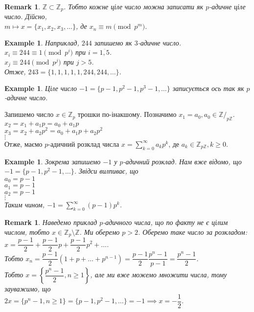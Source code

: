 \documentclass[a4paper, 14pt]{extarticle}
\theoremstyle{theoremdd}
\theoremstyle{theoremdd}
\theoremstyle{theoremdd}
\theoremstyle{theoremdd}
\newtheorem{example}[theorem]{Example}
\theoremstyle{theoremdd}
\theoremstyle{theoremdd}
\newtheorem{remark}[theorem]{Remark}
\theoremstyle{theoremdd}
\theoremstyle{theoremdd}
\begin{document}
\begin{remark}
$\mathbb{Z} \subset \mathbb{Z}_p$. Тобто кожне ціле число можна записати як $p$-адичне ціле число. Дійсно,\\
$m \mapsto x = \{x_1,x_2,x_3,\dots\}$, де $x_n \equiv m \pmod {p^m}$.
\end{remark}

\begin{example}
Наприклад, $244$ запишемо як $3$-адичне число.\\
$x_i \equiv 244 \equiv 1 \pmod {p^i}$ при $i = \overline{1,5}$.\\
$x_j \equiv 244 \pmod {p^j}$ при $j > 5$.\\
Отже, $243 = \{1,1,1,1,1,244,244,\dots\}$.
\end{example}

\begin{example}
Ціле число $-1 = \{p-1,p^2-1,p^3-1,\dots\}$ записується ось так як $p$-адичне число.
\end{example}

Запишемо число $x \in \mathbb{Z}_p$ трошки по-інакшому. Позначимо $x_1 = a_0, a_0 \in \mathbb{Z}/_{p\mathbb{Z}}$.\\
$x_2 = x_1 + a_1p = a_0 + a_1p$\\
$x_3 = x_2 + a_2p^2 = a_0 + a_1p + a_2p^2$\\
$\vdots$\\
Отже, маємо $p$-адичний розклад числа $x = \displaystyle\sum_{k=0}^\infty a_k p^k$, де $a_k \in \mathbb{Z}_{p \mathbb{Z}}, k \geq 0$.

\begin{example}
Зокрема запишемо $-1$ у $p$-адичний розклад. Нам вже відомо, що $-1 = \{p-1,p^2-1,\dots\}$. Звідси вилпиває, що\\
$a_0 = p-1$\\
$a_1 = p-1$\\
$a_2 = p-1$\\
$\vdots$\\
Таким чином, $-1 = \displaystyle\sum_{k=0}^\infty (p-1) p^k$.
\end{example}

\begin{remark}
Наведемо приклад $p$-адичного числа, що по факту не є цілим числом, тобто $x \in \mathbb{Z}_p \setminus \mathbb{Z}$. Ми оберемо $p > 2$. Оберемо таке число за розкладом:\\
$x = \dfrac{p-1}{2} + \dfrac{p-1}{2}p + \dfrac{p-1}{2}p^2 + \dots$.\\
Тобто $x_n = \dfrac{p-1}{2}(1+p+\dots+p^{n-1}) = \dfrac{p-1}{2} \dfrac{p^n-1}{p-1} = \dfrac{p^n-1}{2}$.\\
Тобто $x = \left\{ \dfrac{p^n-1}{2}, n \geq 1 \right\}$, але ми вже можемо множити числа, тому зауважимо, що\\
$2 x = \{p^n-1, n \geq 1\} = \{p-1,p^2-1,\dots\} = -1 \implies x = -\dfrac{1}{2}$.
\end{remark}
\end{document}
